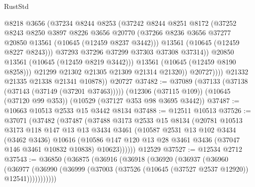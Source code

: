 \begin{lexlean}{RustStd}
\begin{coremodule}
                        @8218
                        @3656
                        (@37234
                          @8244
                          @8253
                          (@37242
                            @8244
                            @8251
                            @8172
                            (@37252
                              @8243
                              @8250
                              @3897
                              @8226
                              @3656
                              @20770
                              (@37266
                                @8236
                                @3656
                                @37277
                                @20850
                                @13561
                                (@10645 (@12459 @8237 @3442)))
                              @13561
                              (@10645 (@12459 @8227 @8243)))
                            @37293
                            @37296
                            @37299
                            @37303
                            @37308
                            @37314))
                        @20850
                        @13561
                        (@10645 (@12459 @8219 @3442)))
                      @13561
                      (@10645 (@12459 @8190 @8258)))
                    @21299
                    @21302
                    @21305
                    @21309
                    @21314
                    @21320))
                @20727))))
        @21332
        @21335
        @21338
        @21341
        @10878))
    @20727
@37482 := @37089
    (@37133 (@37138 (@37143 (@37149 (@37201 @37463)))))
    (@12306 (@37115 @109))
    (@10645 (@37120 @99 @353))
    (@10529 (@37127 @353 @98 @3695 @3442))
@37487 := @10663 @10513 @2533 @15 @3442 @8134
@37488 := @12511 @10513
@37526 := @37071
    (@37482
      (@37487
        (@37488
          @3173
          @2533
          @15
          @8134
          (@20781
            @10513
            @3173
            @118
            @147
            @13
            @13
            @3434
            @3461
            (@10587
              @2531
              @13
              @102
              @3434
              (@3462 @3436)
              @10616
              (@10586 @147 @120 @13 @28 @3461 @3436 (@37047 @146 @3461 @10832 @10838) @10623))))))
    @12529
@37527 := @12534 @2712
@37543 := @36850
    (@36875
      (@36916
        (@36918
          (@36920
            (@36937
              (@36960
                (@36977
                  (@36990 (@36999 (@37003 (@37526 (@10645 (@37527 @2537 @12920)) @12541)))))))))))

\end{coremodule}
\end{lexlean}
